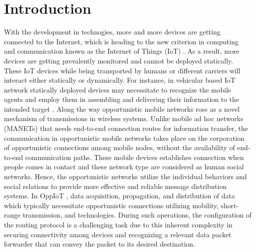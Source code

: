 \documentclass[10pt,journal]{IEEEtran}
\begin{document}




%
\section{Introduction}
With the development in technogies, more and more devices are getting connected to the Internet, which is heading to the new criterion in computing and communication known as the Internet of Things (IoT) \cite{iot2010}. As a result, more devices are getting prevalently monitored and cannot be deployed statically. These IoT devices while being transported by humans or different carriers will interact either statically or dynamically. For instance, in vehicular based IoT network statically deployed devices may necessitate to recognize the mobile agents and employ them in assembling and delivering their information to the intended target \cite{srinidhi2018network}. 
Along the way opportunistic mobile networks \cite{2006opnet} rose as a novel mechanism of transmissions in wireless systems. Unlike mobile ad hoc networks (MANETs) that needs end-to-end connection routes for information transfer, the communication in opportunistic mobile networks takes place on the corporation of opportunistic connections among mobile nodes, without the availability of end-to-end communication paths. These mobile devices establishes connection when people comes in contact and these network type are considered as human social networks. Hence, the opportunistic networks utilize the individual behaviors and social relations to provide more effective and reliable message distribution systems. In OppIoT \cite{iot2013}, data acquisition, propagation, and distribution of data which typically necessitate opportunistic connections utilizing mobility, short-range transmission, and technologies. During such operations, the configuration of the routing protocol is a challenging task due to this inherent complexity in securing connectivity among devices and recognizing a relevant data packet forwarder that can convey the packet to its desired destination.
\end{document}
